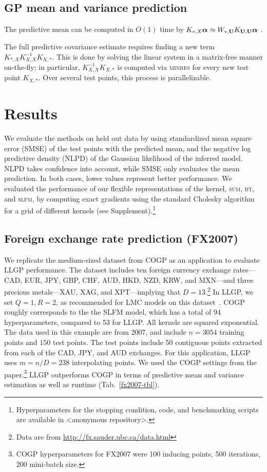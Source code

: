 \documentclass{article}
\begin{document}
\subsection{GP mean and variance prediction}

The predictive mean can be computed in $O(1)$ time by $K_{*,X}{\boldsymbol\alpha}\approx W_{*,\textbf{U}}K_{\textbf{U},\textbf{U}}{\boldsymbol\alpha}$ \cite{msgp}.

The full predictive covariance estimate requires finding a new term $K_{*,X}K_{X,X}^{-1}K_{X,*}$. This is done by solving the linear system in a matrix-free manner on-the-fly; in particular, $K_{X,X}^{-1}K_{X,*}$ is computed via \textsc{minres} for every new test point $K_{X,*}$. Over several test points, this process is parallelizable.

\section{Results}
\label{sec:results}
We evaluate the methods on held out data by using standardized mean square error (SMSE) of the test points with the predicted mean, and the negative log predictive density (NLPD) of the Gaussian likelihood of the inferred model. NLPD takes confidence into account, while SMSE only evaluates the mean prediction. In both cases, lower values represent better performance. We evaluated the performance of our flexible representations of the kernel, \textsc{sum}, \textsc{bt}, and \textsc{slfm}, by computing exact gradients using the standard Cholesky algorithm for a grid of different kernels (see Supplement).\footnote{Hyperparameters for the stopping condition, code, and benchmarking scripts are available in <anonymous repository>.}

\subsection{Foreign exchange rate prediction (FX2007)}\label{fx2007-results}

We replicate the medium-sized dataset from COGP as an application to evaluate LLGP performance. The dataset includes ten foreign currency exchange rates---CAD, EUR, JPY, GBP, CHF, AUD, HKD, NZD, KRW, and MXN---and three precious metals---XAU, XAG, and XPT---implying that $D=13$.\footnote{Data are from \url{http://fx.sauder.ubc.ca/data.html}} In LLGP, we set $Q=1,R=2$, as recommended for LMC models on this dataset~\cite{alvarez2010efficient}. COGP roughly corresponds to the the SLFM model, which has a total of 94 hyperparameters, compared to 53 for LLGP. All kernels are squared exponential. The data used in this example are from 2007, and include $n=3054$ training points and $150$ test points. The test points include 50 contiguous points extracted from each of the CAD, JPY, and AUD exchanges. For this application, LLGP uses $m=n/D=238$ interpolating points. We used the COGP settings from the paper.\footnote{COGP hyperparameters for FX2007 were 100 inducing points, 500 iterations, 200 mini-batch size.} LLGP outperforms COGP in terms of predictive mean and variance estimation as well as runtime (Tab.~\ref{fx2007-tbl}).
\end{document}

